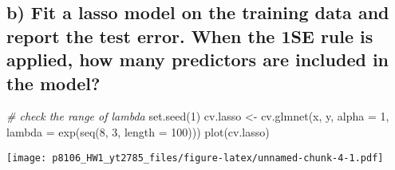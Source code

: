 \documentclass[
]{article}
\newenvironment{Shaded}{\begin{snugshade}}{\end{snugshade}}
\newcommand{\AttributeTok}[1]{\textcolor[rgb]{0.77,0.63,0.00}{#1}}
\newcommand{\CommentTok}[1]{\textcolor[rgb]{0.56,0.35,0.01}{\textit{#1}}}
\newcommand{\DecValTok}[1]{\textcolor[rgb]{0.00,0.00,0.81}{#1}}
\newcommand{\FunctionTok}[1]{\textcolor[rgb]{0.00,0.00,0.00}{#1}}
\newcommand{\NormalTok}[1]{#1}
\newcommand{\OtherTok}[1]{\textcolor[rgb]{0.56,0.35,0.01}{#1}}
\newcommand{\SpecialCharTok}[1]{\textcolor[rgb]{0.00,0.00,0.00}{#1}}
\newcommand{\StringTok}[1]{\textcolor[rgb]{0.31,0.60,0.02}{#1}}
\begin{document}
\hypertarget{b-fit-a-lasso-model-on-the-training-data-and-report-the-test-error.-when-the-1se-rule-is-applied-how-many-predictors-are-included-in-the-model}{%
\subsection{b) Fit a lasso model on the training data and report the
test error. When the 1SE rule is applied, how many predictors are
included in the
model?}\label{b-fit-a-lasso-model-on-the-training-data-and-report-the-test-error.-when-the-1se-rule-is-applied-how-many-predictors-are-included-in-the-model}}

\begin{Shaded}
\begin{Highlighting}[]
\CommentTok{\# check the range of lambda}
\FunctionTok{set.seed}\NormalTok{(}\DecValTok{1}\NormalTok{)}
\NormalTok{cv.lasso }\OtherTok{\textless{}{-}} \FunctionTok{cv.glmnet}\NormalTok{(x, y, }
                      \AttributeTok{alpha =} \DecValTok{1}\NormalTok{, }
                      \AttributeTok{lambda =} \FunctionTok{exp}\NormalTok{(}\FunctionTok{seq}\NormalTok{(}\DecValTok{8}\NormalTok{, }\DecValTok{3}\NormalTok{, }\AttributeTok{length =} \DecValTok{100}\NormalTok{)))}
\FunctionTok{plot}\NormalTok{(cv.lasso)}
\end{Highlighting}
\end{Shaded}

\texttt{[image: p8106\_HW1\_yt2785\_files/figure-latex/unnamed-chunk-4-1.pdf]}

\begin{Shaded}
\end{Shaded}
\end{document}
